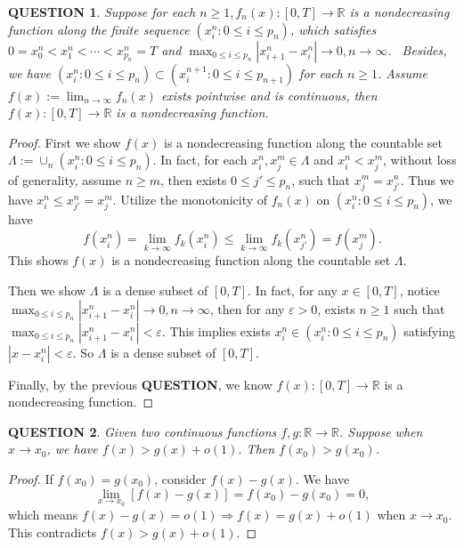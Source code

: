 \documentclass[12pt]{article}
\renewcommand{\(}{\left(}%
\renewcommand{\)}{\right)}%
\renewcommand{\[}{\left[}%
\renewcommand{\]}{\right]}%
\renewcommand{\r}{\mathbb{R}}
\newtheorem{question}{QUESTION}[section]}
\newtheorem{proof}{Proof.}}
\begin{document}
  \begin{question}
   Suppose for each $n\geq 1,f_n(x):[0,T]\to\r$ is a nondecreasing function along the finite sequence $(x_i^n:0\leq i\leq p_n)$, which satisfies $0=x_0^n<x_1^n<\cdots< x_{p_n}^{n}=T$ and $\max_{0\leq i\leq p_n}|x_{i+1}^{n}-x_{i}^{n}|\to 0,n\to\infty$. \ Besides, we have $(x_i^n:0\leq i\leq p_n)\subset (x_i^{n+1}:0\leq i\leq p_{n+1})$ for each $n\geq 1$.
   Assume $f(x):=\lim_{n\to\infty}f_n(x)$ exists pointwise and is continuous, then $f(x):[0,T]\to\r$ is a nondecreasing function.
  \end{question}
  \begin{proof}
   First we show $f(x)$ is a nondecreasing function along the countable set $\Lambda:= \cup_n(x_i^n:0\leq i\leq p_n)$. In fact, for each $x_i^n,x_j^m\in\Lambda$ and $x_i^n<x_j^m$, without loss of generality, assume $n\geq m$, then exists $0\leq j'\leq p_n$, such that $x_j^m=x_{j'}^n$. Thus we have $x_i^n\leq x_{j'}^n=x_j^m$. Utilize the monotonicity of $f_n(x)$ on $(x_i^n:0\leq i\leq p_n)$, we have
   \begin{equation*}
    f(x_i^n)=\lim_{k\to\infty}f_k(x_i^n)\leq \lim_{k\to\infty}f_k(x_{j'}^n)=f(x_j^m).
   \end{equation*}
   This shows $f(x)$ is a nondecreasing function along the countable set $\Lambda$.

   Then we show $\Lambda$ is a dense subset of $[0,T]$. In fact, for any $x\in [0,T]$, notice $\max_{0\leq i\leq p_n}|x_{i+1}^{n}-x_{i}^{n}|\to 0,n\to\infty$, then for any $\varepsilon>0$, exists $n\geq 1$ such that $\max_{0\leq i\leq p_n}|x_{i+1}^{n}-x_{i}^{n}|<\varepsilon$. This implies exists $x_i^n\in (x_i^n:0\leq i\leq p_n)$ satisfying $|x-x_i^n|<\varepsilon$. So $\Lambda$ is a dense subset of $[0,T]$.

   Finally, by the previous {\bfseries QUESTION}, we know $f(x):[0,T]\to\r$ is a nondecreasing function.
  \end{proof}

  \begin{question}
   Given two continuous functions $f,g:\r\to\r$. Suppose when $x\to x_0$, we have $f(x)>g(x)+o(1)$. Then $f(x_0)>g(x_0)$.
  \end{question}
  \begin{proof}
   If $f(x_0)=g(x_0)$, consider $f(x)-g(x)$. We have
   \begin{equation*}
    \lim_{x\to x_0}[f(x)-g(x)]=f(x_0)-g(x_0)=0,
   \end{equation*}
   which means $f(x)-g(x)=o(1)\Longrightarrow f(x)=g(x)+o(1)$ when $x\to x_0$. This contradicts  $f(x)>g(x)+o(1)$.
  \end{proof}
  
\end{document}
